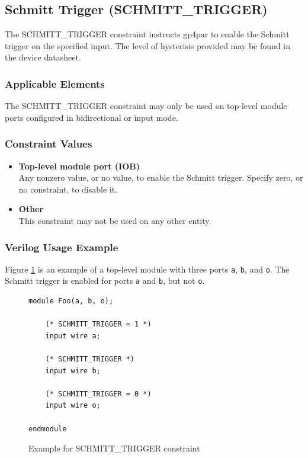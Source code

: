 \documentclass{article}
\begin{document}

\pagebreak
\subsection{Schmitt Trigger (SCHMITT\_TRIGGER)}

The SCHMITT\_TRIGGER constraint instructs gp4par to enable the Schmitt trigger on the specified input. The level 
of hysterisis provided may be found in the device datasheet.

\subsubsection{Applicable Elements}
The SCHMITT\_TRIGGER constraint may only be used on top-level module ports configured in bidirectional or input mode. 

\subsubsection{Constraint Values}
\begin{itemize}
\item {\bfseries Top-level module port (IOB)}\\
Any nonzero value, or no value, to enable the Schmitt trigger. Specify zero, or no constraint, to disable it.
\item {\bfseries Other} \\
This constraint may not be used on any other entity.
\end{itemize}

\subsubsection{Verilog Usage Example}

Figure \ref{constraint-schmitt} is an example of a top-level module with three ports \texttt{a}, \texttt{b}, and
\texttt{o}. The Schmitt trigger is enabled for ports  \texttt{a} and \texttt{b}, but not \texttt{o}.

\begin{figure}[h]
\begin{lstlisting}
module Foo(a, b, o);

	(* SCHMITT_TRIGGER = 1 *)
	input wire a;

	(* SCHMITT_TRIGGER *)
	input wire b;

	(* SCHMITT_TRIGGER = 0 *)
	input wire o;
	
endmodule
\end{lstlisting}
\caption{Example for SCHMITT\_TRIGGER constraint}
\label{constraint-schmitt}
\end{figure}
\end{document}
